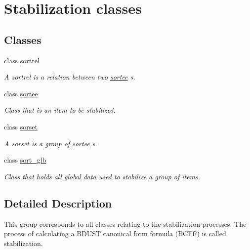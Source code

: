 \hypertarget{group__docgrp__stab__classes}{\section{Stabilization classes}
\label{group__docgrp__stab__classes}
}
\subsection*{Classes}
\begin{DoxyCompactItemize}
\item 
class \hyperlink{classsortrel}{sortrel}
\begin{DoxyCompactList}\small\item\em A sortrel is a relation between two \hyperlink{classsortee}{sortee} s. \end{DoxyCompactList}\item 
class \hyperlink{classsortee}{sortee}
\begin{DoxyCompactList}\small\item\em Class that is an item to be stabilized. \end{DoxyCompactList}\item 
class \hyperlink{classsorset}{sorset}
\begin{DoxyCompactList}\small\item\em A sorset is a group of \hyperlink{classsortee}{sortee} s. \end{DoxyCompactList}\item 
class \hyperlink{classsort__glb}{sort\+\_\+glb}
\begin{DoxyCompactList}\small\item\em Class that holds all global data used to stabilize a group of items. \end{DoxyCompactList}\end{DoxyCompactItemize}


\subsection{Detailed Description}
This group corresponds to all classes relating to the stabilization processes. The process of calculating a B\+D\+U\+S\+T canonical form formula (B\+C\+F\+F) is called stabilization. 